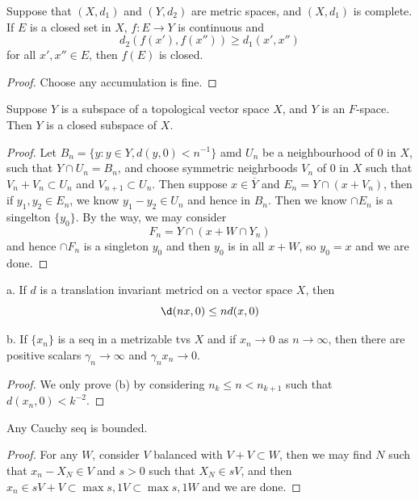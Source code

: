 \begin{theorem}
    Suppose that $(X,d_1)$ and $(Y,d_2)$ are metric spaces, and $(X,d_1)$ is complete. If $E$ is a closed set in $X$, $f:E\to Y$ is continuous and
    \[d_2(f(x'),f(x'')) \geq d_1(x',x'')\]
    for all $x',x'' \in E$, then $f(E)$ is closed.
\end{theorem}
\begin{proof}
    Choose any accumulation is fine.
\end{proof}

\begin{theorem}
    Suppose $Y$ is a subspace of a topological vector space $X$, and $Y$ is an $F$-space. Then $Y$ is a closed subspace of $X$.
\end{theorem}
\begin{proof}
    Let $B_n = \{y:y\in Y, d(y,0) < n^{-1}\}$ amd $U_n$ be a neighbourhood of $0$ in $X$, such that $Y\cap U_n = B_{n}$, and choose symmetric neighrboods $V_n$ of $0$ in $X$ such that $V_n+V_n\subset U_n$ and $V_{n+1}\subset U_{n}$. Then suppose $x\in\overline{Y}$ and $E_n  =Y\cap(x+V_n)$, then if $y_1,y_2\in E_n$, we know $y_1 - y_2 \in U_n$ and hence in $B_{n}$. Then we know $\cap E_n$ is a singelton $\{y_0\}$. By the way, we may consider
    \[F_n = Y\cap (x+W\cap Y_n)\]
    and hence $\cap F_n$ is a singleton $y_0$ and then $y_0$ is in all $x+W$, so $y_0  = x$ and we are done.
\end{proof}

\begin{theorem}
    a. If $d$ is a translation invariant metricd on a vector space $X$, then
    \[\d(nx,0) \leq nd(x,0)\]\par
    b. If $\{x_n\}$ is a seq in a metrizable tvs $X$ and if $x_n \to 0$ as $n\to\infty$, then there are positive scalars $\gamma_n \to \infty$ and $\gamma_n x_n \to 0$.
\end{theorem}
\begin{proof}
    We only prove (b) by considering $n_k \leq n < n_{k+1}$ such that $d(x_{n}, 0) < k^{-2}$.
\end{proof}

\begin{proposition}
    Any Cauchy seq is bounded.
\end{proposition}
\begin{proof}
    For any $W$, consider $V$ balanced with $V+V\subset W$, then we may find $N$ such that $x_n - X_N \in V$ and $s>0$ such that $X_N \in sV$, and then $x_n \in sV + V \subset \max{s,1}V \subset \max{s,1}W$ and we are done.
\end{proof}


